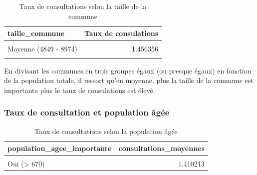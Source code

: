 \documentclass[
]{article}
\begin{document}
\begin{table}[H]

\caption{\label{tab:unnamed-chunk-12}Taux de consultations selon la taille de la commune}
\centering
\begin{tabular}[t]{lr}
\toprule
taille\_commune & Taux de consulations\\
\midrule
\cellcolor{gray!6}{Grande (> 8974)} & \cellcolor{gray!6}{1.526810}\\
Moyenne (4849 - 8974) & 1.456356\\
\cellcolor{gray!6}{Petite (<= 4848)} & \cellcolor{gray!6}{1.383861}\\
\bottomrule
\end{tabular}
\end{table}

En divisant les communes en trois groupes égaux (ou presque égaux) en
fonction de la population totale, il ressort qu'en moyenne, plus la
taille de la commune est importante plus le taux de consulations est
élevé.

\hypertarget{taux-de-consultation-et-population-uxe2guxe9e}{%
\subsubsection{Taux de consultation et population
âgée}\label{taux-de-consultation-et-population-uxe2guxe9e}}

\begin{table}[H]

\caption{\label{tab:unnamed-chunk-13}Taux de consultations selon la population âgée}
\centering
\begin{tabular}[t]{lr}
\toprule
population\_agee\_importante & consultations\_moyennes\\
\midrule
\cellcolor{gray!6}{Non (<= 670)} & \cellcolor{gray!6}{1.501111}\\
Oui (> 670) & 1.410213\\
\bottomrule
\end{tabular}
\end{table}
\end{document}
